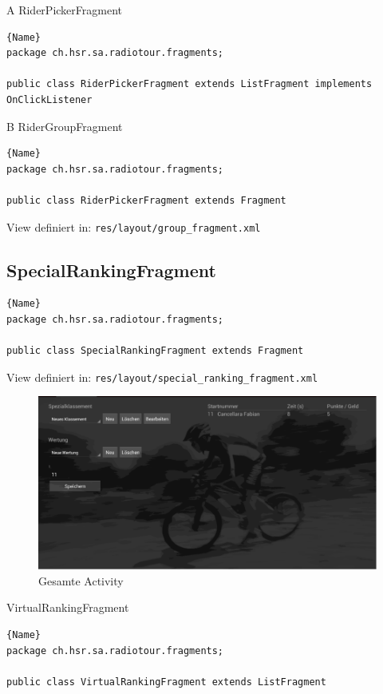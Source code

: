 A RiderPickerFragment
\begin{lstlisting}{Name}
package ch.hsr.sa.radiotour.fragments;

public class RiderPickerFragment extends ListFragment implements OnClickListener
\end{lstlisting}


B RiderGroupFragment
\begin{lstlisting}{Name}
package ch.hsr.sa.radiotour.fragments;

public class RiderPickerFragment extends Fragment
\end{lstlisting}


View definiert in:
\lstinline|res/layout/group_fragment.xml|

\subsection{SpecialRankingFragment}
\begin{lstlisting}{Name}
package ch.hsr.sa.radiotour.fragments;

public class SpecialRankingFragment extends Fragment
\end{lstlisting}

View definiert in:
\lstinline|res/layout/special_ranking_fragment.xml|

\begin{figure}[h!]
\caption{Gesamte Activity}
\centering
\includegraphics[scale=0.9]{07anhang/images/dev_specialranking.png}
\end{figure}


VirtualRankingFragment
\begin{lstlisting}{Name}
package ch.hsr.sa.radiotour.fragments;

public class VirtualRankingFragment extends ListFragment
\end{lstlisting}


